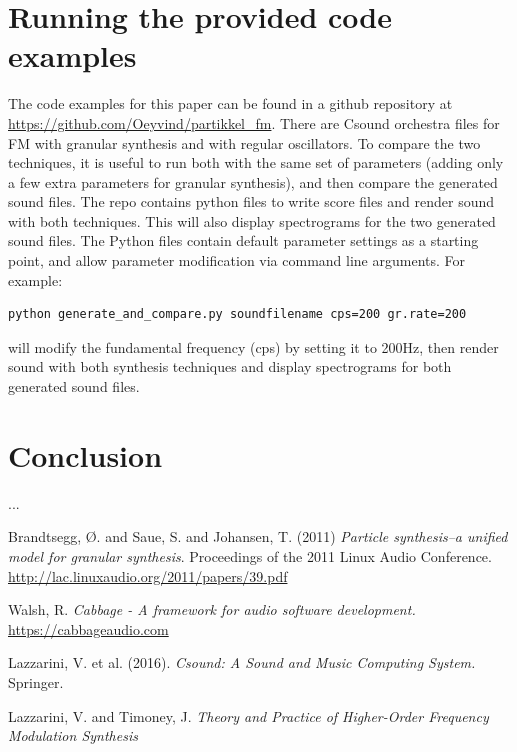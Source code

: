 \documentclass[runningheads,a4paper]{llncs}
\begin{document}
\section{Running the provided code examples}
The code examples for this paper can be found in a github repository at \url{https://github.com/Oeyvind/partikkel_fm}. There are Csound orchestra files for FM with granular synthesis and with regular oscillators. To compare the two techniques, it is useful to run both with the same set of parameters (adding only a few extra parameters for granular synthesis), and then compare the generated sound files. The repo contains python files to write score files and render sound with both techniques. This will also display spectrograms for the two generated sound files. The Python files contain default parameter settings as a starting point, and allow parameter modification via command line arguments. For example:
\begin{lstlisting}
python generate_and_compare.py soundfilename cps=200 gr.rate=200
\end{lstlisting}
will modify the fundamental frequency (cps) by setting it to 200Hz, then render sound with both synthesis techniques and display spectrograms for both generated sound files. 

\section{Conclusion}
...

\begin{thebibliography}{4}


 Brandtsegg, Ø. and Saue, S. and Johansen, T. (2011) \emph{Particle synthesis–a unified model for granular synthesis}. Proceedings of the 2011 Linux Audio Conference. \url{http://lac.linuxaudio.org/2011/papers/39.pdf}

 Walsh, R. \emph{Cabbage - A framework for audio software development.} \url{https://cabbageaudio.com}

 Lazzarini, V. et al. (2016). \emph{Csound: A Sound and Music Computing System.} Springer.

 Lazzarini, V. and Timoney, J. \emph{Theory and Practice of Higher-Order Frequency Modulation
Synthesis}


\end{thebibliography}
\end{document}
